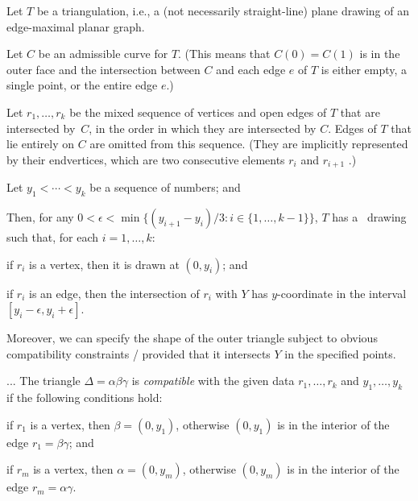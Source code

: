 \begin{thm}

	\begin{compactenum}
        \item Let $T$ be a triangulation,
          i.e.,
          a (not necessarily straight-line)
plane drawing of an edge-maximal planar graph.
		\item Let $C$ be an admissible curve for $T$.
(This means that $C(0)=C(1)$ is in the outer face and the intersection between $C$ and each edge $e$ of $T$ is
either empty, a single point, or the entire edge $e$.)                  
\item Let $r_1,\ldots,r_k$ be the mixed sequence of vertices and open edges
  of $T$ that are intersected by~$C$, in the order in
  which they are intersected by $C$. Edges of $T$ that
  lie entirely on $C$
are omitted from this sequence.
(They are implicitly represented by their endvertices, which are two consecutive elements $r_i$ and $r_{i+1}$ .)
		\item Let $y_1<\cdots<y_k$ be a sequence of numbers; and
	\end{compactenum}
	Then, for any
        $0<\epsilon<\min\{(y_{i+1}-y_i)/3:i\in\{1,\ldots,k-1\}\}$, $T$
        has a \Fary\ drawing such that,
        for each $i=1,\ldots,k$: 
	\begin{compactenum}
		\item if $r_i$ is a vertex, then it is drawn at $(0,y_i)$; and
		\item if $r_i$ is an edge, then the intersection of $r_i$ with $Y$ has $y$-coordinate in the interval $[y_i-\epsilon,y_i+\epsilon]$.
\end{compactenum}

Moreover, we can specify the shape of the outer triangle
subject to
obvious compatibility constraints
/ provided that it intersects $Y$ in the specified points.
                
\end{thm}

...
The triangle $\Delta=\alpha\beta\gamma$ is \emph{compatible} with the
given data $r_1,\ldots,r_k$ and $y_1,\ldots,y_k$ if the following conditions hold:
\begin{compactenum}
	\item if $r_1$ is a vertex, then $\beta=(0,y_1)$, otherwise $(0, y_1)$ is in the interior of the edge $r_1=\beta\gamma$; and
	\item if $r_m$ is a vertex, then $\alpha=(0,y_m)$, otherwise $(0,y_m)$ is in the interior
	of the edge $r_m=\alpha\gamma$.
\end{compactenum}


